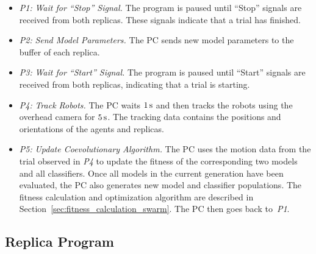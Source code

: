 \begin{itemize}
	\item \textit{P1:} \textit{Wait for ``Stop'' Signal.} The program is paused until ``Stop'' signals are received from both replicas. These signals indicate that a trial has finished.
	
	\item \textit{P2:} \textit{Send Model Parameters.} The PC sends new model parameters to the buffer of each replica. %
	
	\item \textit{P3:} \textit{Wait for ``Start'' Signal.} The program is paused until ``Start'' signals are received from both replicas, indicating that a trial is starting.
	
	\item \textit{P4:} \textit{Track Robots.} The PC waits $\unit[1]{s}$ and then tracks the robots using the overhead camera for $\unit[5]{s}$. The tracking data contains the positions and orientations of the agents and replicas. 
	
	\item \textit{P5:} \textit{Update Coevolutionary Algorithm.} The PC uses the motion data from the trial observed in \textit{P4} to update the fitness of the corresponding two models and all classifiers. Once all models in the current generation have been evaluated, the PC also generates new model and classifier populations. The fitness calculation and optimization algorithm are described in Section~\ref{sec:fitness_calculation_swarm}. The PC then goes back to~\textit{P1}. 
\end{itemize}

\subsection{Replica Program}\label{sec:replica_program_physical_swarm}

